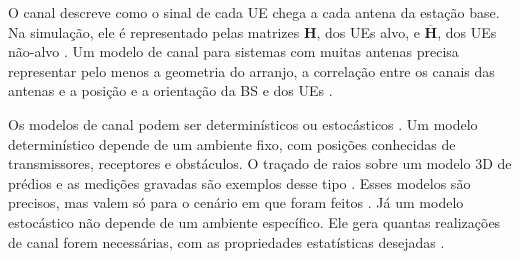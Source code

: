 %
%
%
%



O canal descreve como o sinal de cada UE chega a cada antena da estação base. Na simulação, ele é representado pelas matrizes $\mathbf{H}$, dos UEs alvo, e $\overline{\mathbf{H}}$, dos UEs não-alvo \cite{zhao-lmmse}.
Um modelo de canal para sistemas com muitas antenas precisa representar pelo menos a geometria do arranjo, a correlação entre os canais das antenas e a posição e a orientação da BS e dos UEs \cite[p.~329]{bjornson-mimo}.

Os modelos de canal podem ser determinísticos ou estocásticos \cite[p.~329]{bjornson-mimo}. Um modelo determinístico depende de um ambiente fixo, com posições conhecidas de transmissores, receptores e obstáculos. O traçado de raios sobre um modelo 3D de prédios e as medições gravadas são exemplos desse tipo \cite[p.~329]{bjornson-mimo}. Esses modelos são precisos, mas valem só para o cenário em que foram feitos \cite[p.~330]{bjornson-mimo}. Já um modelo estocástico não depende de um ambiente específico. Ele gera quantas realizações de canal forem necessárias, com as propriedades estatísticas desejadas \cite[p.~330]{bjornson-mimo}.

